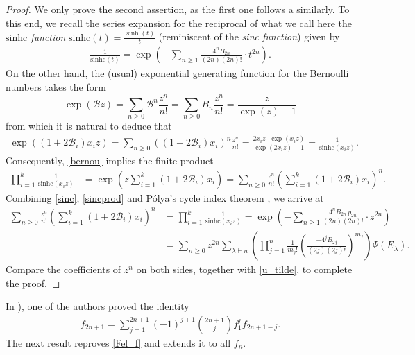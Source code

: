 \documentclass[11pt]{amsart}
\theoremstyle{definition}
\theoremstyle{remark}
\numberwithin{equation}{section}
\begin{document}
\begin{proof} We only prove the second assertion, as the first one follows a similarly. To this end, we recall the series expansion \cite[1.518.1]{GR} for the reciprocal of what we call here the \emph{$\text{sinhc}$ function} 
$\text{sinhc}(t)=\frac{\sinh(t)}t$ (reminiscent of the \emph{sinc function}) given by
\begin{align} \label{sinc} \frac1{\text{sinhc}(t)} 
= \exp\left(-\sum_{n\geq1} \frac{4^n B_{2n}}{(2n)(2n)!}\cdot t^{2n}\right). \end{align}
On the other hand, the (usual) exponential generating function for the Bernoulli numbers takes the form
$$\exp(\mathcal{B}z)=\sum_{n\geq0} \mathcal{B}^n\frac{z^n}{n!} = \sum_{n\geq0} B_n \frac{z^n}{n!} = \frac{z}{\exp(z)-1} $$
from which it is natural to deduce that
\begin{align} \label{bernou} \exp((1+2\mathcal{B}_i)x_iz) = \sum_{n\geq0} ((1+2\mathcal{B}_i)x_i)^n\frac{z^n}{n!} = \frac{2x_iz\cdot \exp(x_iz)}{\exp(2x_iz)-1} = \frac1{\text{sinhc}(x_iz)}. \end{align}
Consequently, \eqref{bernou} implies the finite product 
\begin{align} \label{sincprod}
\prod_{i=1}^k\frac1{\text{sinhc}(x_iz)}  & = \exp\left(z\sum_{i=1}^k (1+2\mathcal{B}_i)x_i\right) 
 = \sum_{n\geq0} \frac{z^n}{n!} \left(\sum_{i=1}^k(1+2\mathcal{B}_i)x_i \right)^n.
\end{align}
Combining \eqref{sinc}, \eqref{sincprod} and P\'olya's cycle index theorem \cite[Section 5]{RPS}, we arrive at
\begin{align*}
\sum_{n\geq0} \frac{z^n}{n!} \left(\sum_{i=1}^k (1+2\mathcal{B}_i)x_i \right)^n 
&= \prod_{i=1}^k\frac1{\text{sinhc}(x_iz)}  
 =  \exp\left(-\sum_{n\geq1} \frac{4^n B_{2n} \, p_{2n}}{(2n)(2n)!}\cdot z^{2n}\right) \\
& = \sum_{n\geq0} z^{2n} 
\sum_{\lambda\vdash n} \left(\prod_{j=1}^n \frac1{m_j!}\left(\frac{- 4^j B_{2j}}{(2j)(2j)!}\right)^{m_j}\right) \Psi(E_{\lambda}).
\end{align*}
Compare the coefficients of $z^n$ on both sides, together with \eqref{u_tilde}, to complete the proof.
\end{proof}


In \cite[(25)]{Fel}), one of the authors proved the identity
\begin{align} \label{Fel_f} f_{2n+1} =  \sum_{j=1}^{2n+1} (-1)^{j+1} \binom{2n+1}j  f_1^j f_{2n+1-j}. \end{align}
The next result reproves \eqref{Fel_f} and extends it to all $f_n$.
\end{document}
